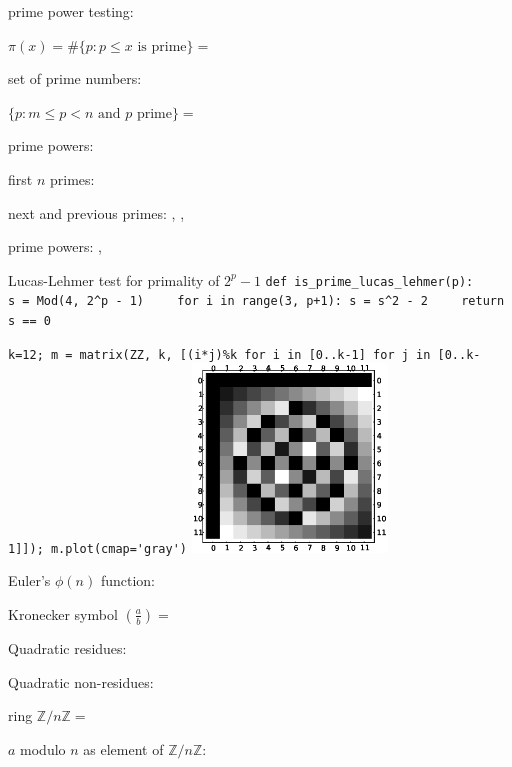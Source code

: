 \documentclass[a4paper]{article}
\newcommand{\kr}[2]{\left(\frac{#1}{#2}\right)}
\newcommand{\ZZ}{\mathbb{Z}}
\begin{document}
\begin{multicols*}{3}
prime power testing: 

$\pi(x) = \#\{p: p \leq x\text{ is prime}\} = $ 

set of prime numbers: 

$\{p : m \leq p < n\text{ and $p$ prime}\} = $

prime powers:  

first $n$ primes: 

next and previous primes: 
,          \BreakLineAndIndent
{},  

prime powers:
,    \BreakLineAndIndent
{}


Lucas-Lehmer test for primality of $2^p-1$
{                                             \ex\BreakLineAndIndent
\verb|def is_prime_lucas_lehmer(p):|           \BreakLineAndIndent
\verb|    s = Mod(4, 2^p - 1)|                 \BreakLineAndIndent
\verb|    for i in range(3, p+1): s = s^2 - 2| \BreakLineAndIndent
\verb|    return s == 0|}




{\tiny
\verb|k=12; m = matrix(ZZ, k, [(i*j)%k for i in [0..k-1] for j in [0..k-1]]); m.plot(cmap='gray')|}
\BreakLineAndIndent
\includegraphics[width=14em]{mod12.eps}

Euler's $\phi(n)$ function: 

Kronecker symbol $\kr{a}{b} = $ 

Quadratic residues: 

Quadratic non-residues: 

ring $\ZZ/n\ZZ = $ 

$a$ modulo $n$ as element of $\ZZ/n\ZZ$: 



\end{multicols*}
\end{document}
